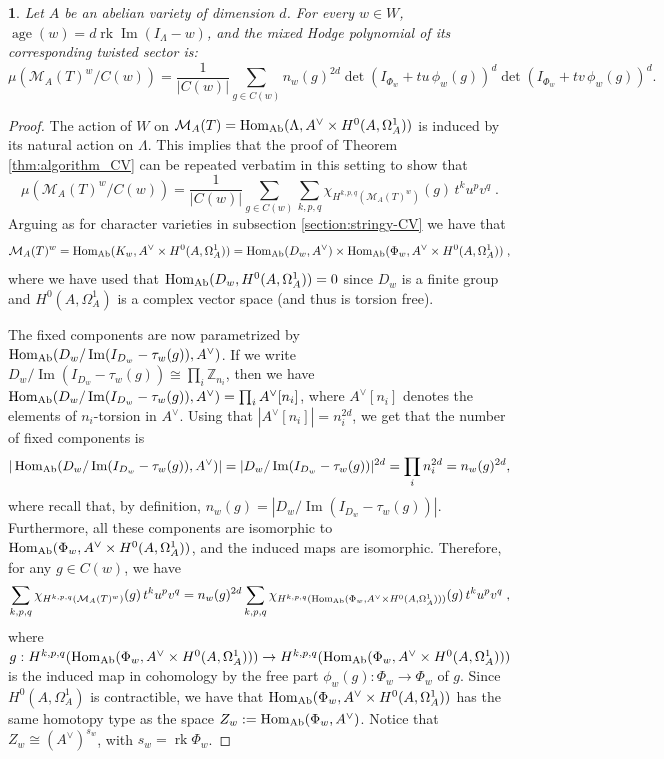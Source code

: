 \documentclass[11pt,english]{amsart}
\numberwithin{equation}{section}
\numberwithin{figure}{section}
\theoremstyle{plain}
\newtheorem{thm}{\protect\theoremname}[section]
\theoremstyle{plain}
\theoremstyle{definition}
\theoremstyle{remark}
\DeclareMathOperator{\image}{Im}
\newcommand{\ZZ}{\mathbb{Z}}
\newcommand{\Hom}{\operatorname{Hom}}
\newcommand{\rk}{\operatorname{rk}}
\newcommand{\age}{\operatorname{age}}
\newcommand{\Ab}{\textup{Ab}}
\providecommand{\theoremname}{Theorem}
\begin{document}
\begin{thm}\label{thm:sector-Higgs}
    Let $A$ be an abelian variety of dimension $d$. For every $w\in W$, \linebreak $\age(w)=d \rk \image(I_\Lambda - w)$, and the mixed Hodge polynomial of its corresponding twisted sector is:
$$
    \mu(\mathcal{M}_A(T)^w / C(w)) = \frac{1}{|C(w)|} \sum_{g \in C(w)}
   n_w(g)^{2d} \det(I_{\Phi_w} + tu\,\phi_w(g))^d\det(I_{\Phi_w} + tv\,\phi_w(g))^d.
$$
\end{thm}
\begin{proof}
The action of $W$ on $\mathcal{M}_A(T) = \Hom_{\Ab}(\Lambda, A^\vee \times H^0(A, \Omega^1_A))$ is induced by its natural action on $\Lambda$. This implies that the proof of Theorem \ref{thm:algorithm_CV} can be repeated verbatim in this setting to show that
$$
    \mu(\mathcal{M}_A(T)^w / C(w)) = \frac{1}{|C(w)|} \sum_{g \in C(w)}
    \sum_{k,p,q} \chi_{H^{k,p,q}(\mathcal{M}_A(T)^w)}(g) \,t^ku^pv^q\; .
$$
Arguing as for character varieties in subsection \ref{section:stringy-CV} we have that
\begin{align*}
    \mathcal{M}_A(T)^w = \Hom_{\Ab}(K_w, A^\vee \times H^0(A, \Omega^1_A)) = \Hom_{\Ab}(D_w, A^\vee) \times \Hom_{\Ab}(\Phi_w, A^\vee \times H^0(A, \Omega^1_A))\; ,
\end{align*}
where we have used that $\Hom_{\Ab}(D_w, H^0(A, \Omega^1_A)) = 0$ since $D_w$ is a finite group and $H^0(A, \Omega^1_A)$ is a complex vector space (and thus is torsion free). 

The fixed components are now parametrized by $\Hom_{\Ab}(D_w/\image(I_{D_w} - \tau_w(g)), A^\vee)$. If we write $D_w/\image(I_{D_w} - \tau_w(g)) \cong \prod_i \ZZ_{n_i}$, then we have $\Hom_{\Ab}(D_w/\image(I_{D_w} - \tau_w(g)), A^\vee) = \prod_i A^\vee[n_i]$, where $A^\vee[n_i]$ denotes the elements of $n_i$-torsion in $A^\vee$. Using that $|A^\vee[n_i]| = n_i^{2d}$, we get that the number of fixed components is
$$
    |\Hom_{\Ab}(D_w/\image(I_{D_w} - \tau_w(g)), A^\vee)| = |D_w/\image(I_{D_w} - \tau_w(g))|^{2d} = \prod_i n_i^{2d} = n_w(g)^{2d},
$$
where recall that, by definition, $n_w(g) = |D_w/\image(I_{D_w} - \tau_w(g))|$. Furthermore, all these components are isomorphic to $\Hom_{\Ab}(\Phi_w, A^\vee \times H^0(A, \Omega^1_A))$, and the induced maps are isomorphic. Therefore, for any $g \in C(w)$, we have 
$$
 \sum_{k,p,q} \chi_{H^{k,p,q}(\mathcal{M}_A(T)^w)}(g) \,t^ku^pv^q = n_w(g)^{2d} \sum_{k,p,q} \chi_{H^{k,p,q}(\Hom_{\Ab}(\Phi_w, A^\vee \times H^0(A, \Omega^1_A)))}(g)\,t^ku^pv^q\; ,
$$
where $g: H^{k,p,q}(\Hom_{\Ab}(\Phi_w, A^\vee \times H^0(A, \Omega^1_A))) \to H^{k,p,q}(\Hom_{\Ab}(\Phi_w, A^\vee \times H^0(A, \Omega^1_A)))$ is the induced map in cohomology by the free part $\phi_w(g): \Phi_w \to \Phi_w$ of $g$. Since $H^0(A, \Omega^1_A)$ is contractible, we have that $\Hom_{\Ab}(\Phi_w, A^\vee \times H^0(A, \Omega^1_A))$ has the same homotopy type as the space $Z_w := \Hom_{\Ab}(\Phi_w, A^\vee)$. Notice that $Z_w \cong (A^\vee)^{s_w}$, with $s_w = \rk \Phi_w$. %


\end{proof}
\end{document}
